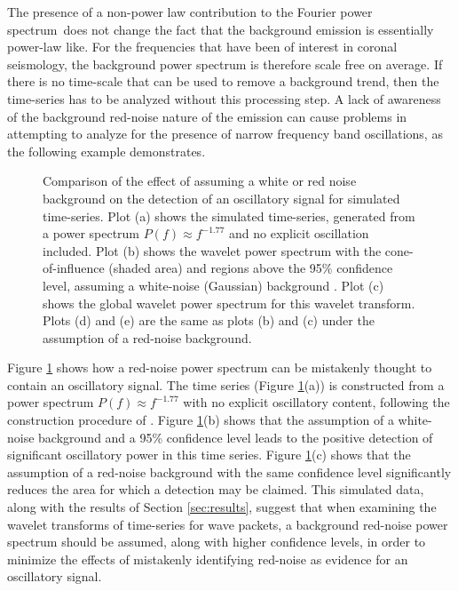 \documentclass[preprint]{../aastex52/aastex}
\newcommand{\PS}{power spectrum}
\newcommand{\Fps}{Fourier \PS}
\begin{document}
The presence of a non-power law contribution to the \Fps\ does not
change the fact that the background emission is essentially power-law
like.  For the frequencies that have been of interest in coronal
seismology, the background power spectrum is therefore scale free on
average.  If there is no time-scale that can be used to remove a
background trend, then the time-series has to be analyzed without this
processing step.  A lack of awareness of the background red-noise
nature of the emission can cause problems in attempting to analyze for
the presence of narrow frequency band oscillations, as the following
example demonstrates.

\begin{figure}
\caption{Comparison of the effect of assuming a white or red noise
  background on the detection of an oscillatory signal for simulated
  time-series.  Plot (a) shows the simulated time-series, generated
  from a power spectrum \protect$P(f)\approx f^{-1.77}$ and no
  explicit oscillation included.  Plot (b) shows the wavelet power
  spectrum with the cone-of-influence (shaded area) and regions above
  the 95\% confidence level, assuming a white-noise (Gaussian)
 background .  Plot (c) shows the global wavelet power spectrum for
  this wavelet transform.  Plots (d) and (e) are the same as plots (b)
  and (c) under the assumption of a red-noise background.\label{fig:comparison}}
\end{figure}

Figure \ref{fig:comparison} shows how a red-noise power spectrum can
be mistakenly thought to contain an oscillatory signal.  The time
series (Figure \ref{fig:comparison}(a)) is constructed from a power
spectrum $P(f)\approx f^{-1.77}$ with no explicit oscillatory content,
following the construction procedure of \cite{vaughan2010}.  Figure
\ref{fig:comparison}(b) shows that the assumption of a white-noise
background and a 95\% confidence level leads to the positive detection
of significant oscillatory power in this time series. Figure
\ref{fig:comparison}(c) shows that the assumption of a red-noise
background with the same confidence level significantly reduces the
area for which a detection may be claimed.  This simulated data, along
with the results of Section \ref{sec:results}, suggest that when
examining the wavelet transforms of time-series for wave packets, a
background red-noise power spectrum should be assumed, along with
higher confidence levels, in order to minimize the effects of
mistakenly identifying red-noise as evidence for an oscillatory
signal.
\end{document}
